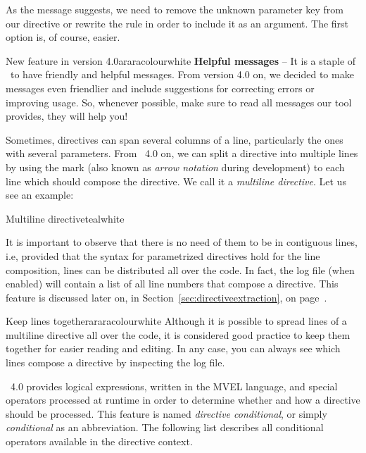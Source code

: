 As the message suggests, we need to remove the unknown parameter key from our directive or rewrite the rule in order to include it as an argument. The first option is, of course, easier.

\begin{messagebox}{New feature in version 4.0}{araracolour}{\icinfo}{white}
\textbf{Helpful messages} -- It is a staple of \arara\ to have friendly and helpful messages. From version 4.0 on, we decided to make messages even friendlier and include suggestions for correcting errors or improving usage. So, whenever possible, make sure to read all messages our tool provides, they will help you!
\end{messagebox}

Sometimes, directives can span several columns of a line, particularly the ones with several parameters. From \arara\ 4.0 on, we can split a directive into multiple lines by using the  mark (also known as \emph{arrow notation} during development) to each line which should compose the directive. We call it a \emph{multiline directive}. Let us see an example:

\begin{codebox}{Multiline directive}{teal}{\icnote}{white}
\end{codebox}

It is important to observe that there is no need of them to be in contiguous lines, i.e, provided that the syntax for parametrized directives hold for the line composition, lines can be distributed all over the code. In fact, the log file (when enabled) will contain a list of all line numbers that compose a directive. This feature is discussed later on, in Section~\ref{sec:directiveextraction}, on page~\pageref{sec:directiveextraction}.

\begin{messagebox}{Keep lines together}{araracolour}{\icinfo}{white}
Although it is possible to spread lines of a multiline directive all over the code, it is considered good practice to keep them together for easier reading and editing. In any case, you can always see which lines compose a directive by inspecting the log file.
\end{messagebox}

\arara\ 4.0 provides logical expressions, written in the \gls{MVEL} language, and special operators processed at runtime in order to determine whether and how a directive should be processed. This feature is named \emph{directive conditional}, or simply \emph{conditional} as an abbreviation. The following list describes all conditional operators available in the directive context.

